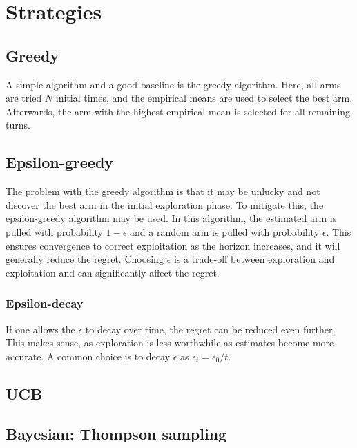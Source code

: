 \section{Strategies}
\subsection{Greedy}
A simple algorithm and a good baseline is the greedy algorithm.
Here, all arms are tried $N$ initial times, and the empirical means are used to select the best arm.
Afterwards, the arm with the highest empirical mean is selected for all remaining turns.

\subsection{Epsilon-greedy}
The problem with the greedy algorithm is that it may be unlucky and not discover the best arm in the initial exploration phase.
To mitigate this, the epsilon-greedy algorithm may be used.
In this algorithm, the estimated arm is pulled with probability $1-\epsilon$ and a random arm is pulled with probability $\epsilon$.
This ensures convergence to correct exploitation as the horizon increases, and it will generally reduce the regret.
Choosing $\epsilon$ is a trade-off between exploration and exploitation and can significantly affect the regret.

\subsubsection{Epsilon-decay}
If one allows the $\epsilon$ to decay over time, the regret can be reduced even further.
This makes sense, as exploration is less worthwhile as estimates become more accurate.
A common choice is to decay $\epsilon$ as $\epsilon_t = \epsilon_0 / t$.

\subsection{UCB}
\subsection{Bayesian: Thompson sampling}
